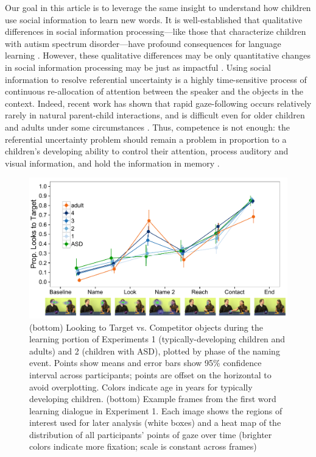 \documentclass{pnastwo}
\begin{document}
\begin{article}
Our goal in this article is to leverage the same insight to understand how children use social information to learn new words. It is well-established that qualitative differences in social information processing---like those that characterize children with autism spectrum disorder---have profound consequences for language learning \cite{baron-cohen1997,leekam1998}. However, these qualitative differences may be only quantitative changes in social information processing may be just as impactful \cite{brooks2005}. Using social information to resolve referential uncertainty is a highly time-sensitive process of continuous re-allocation of attention between the speaker and the objects in the context. Indeed, recent work has shown that rapid gaze-following occurs relatively rarely in natural parent-child interactions, and is difficult even for older children and adults under some circumstances \citep{loomis2008, vida2012, yu2013}. Thus, competence is not enough: the referential uncertainty problem should remain a problem in proportion to a children's developing ability to control their attention, process auditory and visual information, and hold the information in memory \citep{dempster1981, kail1991, gathercole2004}.

\begin{figure}
        \includegraphics[width=.95\textwidth]{figures/bronto_all.pdf}
	\caption{\label{fig:reflook_learning} (bottom) Looking to Target vs. Competitor objects during the learning portion of Experiments 1 (typically-developing children and adults) and 2 (children with ASD), plotted by phase of the naming event. Points show means and error bars show 95\% confidence interval across participants; points are offset on the horizontal to avoid overplotting. Colors indicate age in years for typically developing children. (bottom) Example frames from the first word learning dialogue in Experiment 1. Each image shows the regions of interest used for later analysis (white boxes) and a heat map of the distribution of all participants' points of gaze over time (brighter colors indicate more fixation; scale is constant across frames)}
\end{figure}


\end{article}
\end{document}

